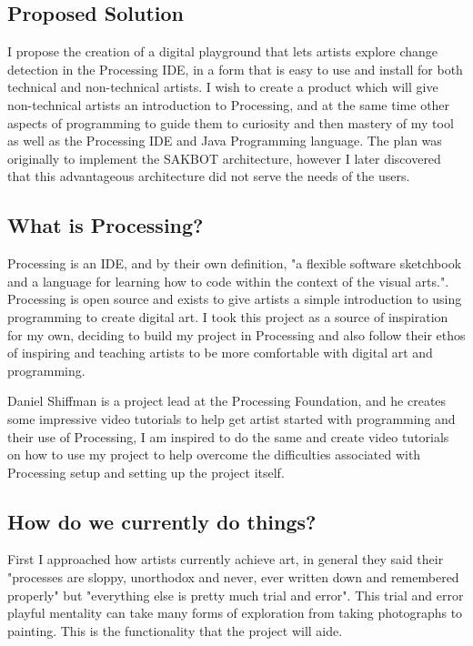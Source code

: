 \documentclass[a4paper]{report}
\begin{document}
\subsection{Proposed Solution}
I propose the creation of a digital playground that lets artists explore change detection in the Processing\cite{PROCESSING} IDE, in a form that is easy to use and install for both technical and non-technical artists. I wish to create a product which will give non-technical artists an introduction to Processing, and at the same time other aspects of programming to guide them to curiosity and then mastery of my tool as well as the Processing IDE and Java Programming language. The plan was originally to implement the SAKBOT architecture\cite{SAKBOT}, however I later discovered that this advantageous architecture did not serve the needs of the users.

\subsection{What is Processing?}
Processing is an IDE, and by their own definition, "a flexible software sketchbook and a language for learning how to code within the context of the visual arts."\cite{PROCESSING}. Processing is open source and exists to give artists a simple introduction to using programming to create digital art. I took this project as a source of inspiration for my own, deciding to build my project in Processing and also follow their ethos of inspiring and teaching artists to be more comfortable with digital art and programming.

Daniel Shiffman \cite{SHIFFMAN} is a project lead at the Processing Foundation, and he creates some impressive video tutorials to help get artist started with programming and their use of Processing, I am inspired to do the same and create video tutorials on how to use my project to help overcome the difficulties associated with Processing setup and setting up the project itself.

\subsection{How do we currently do things?}
First I approached how artists currently achieve art, in general they said their "processes are sloppy, unorthodox and never, ever written down and remembered properly" but "everything else is pretty much trial and error". This trial and error playful mentality can take many forms of exploration from taking photographs to painting. This is the functionality that the project will aide.
\end{document}
